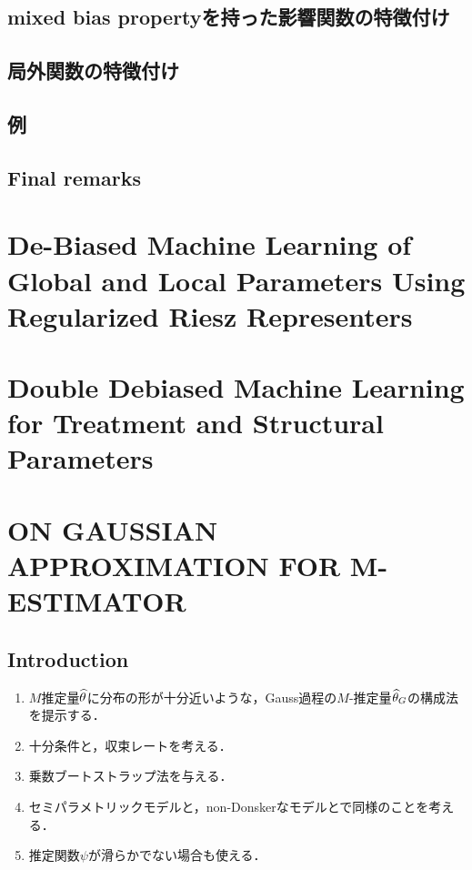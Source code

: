 \documentclass[uplatex,dvipdfmx]{jsreport}
\begin{document}
\subsection{mixed bias propertyを持った影響関数の特徴付け}

\subsection{局外関数の特徴付け}

\subsection{例}

\subsection{Final remarks}

\section{De-Biased Machine Learning of Global and Local Parameters Using Regularized Riesz Representers}

\section{Double Debiased Machine Learning for Treatment and Structural Parameters}

\section{ON GAUSSIAN APPROXIMATION FOR M-ESTIMATOR}

\subsection{Introduction}

\begin{tcolorbox}[colframe=ForestGreen, colback=ForestGreen!10!white,breakable,colbacktitle=ForestGreen!40!white,coltitle=black,fonttitle=\bfseries\sffamily,
title=]
    \begin{enumerate}
        \item $M$推定量$\widehat{\theta}$に分布の形が十分近いような，Gauss過程の$M$-推定量$\widehat{\theta}_G$の構成法を提示する．
        \item 十分条件と，収束レートを考える．
        \item 乗数ブートストラップ法を与える．
        \item セミパラメトリックモデルと，non-Donskerなモデルとで同様のことを考える．
        \item 推定関数$\psi$が滑らかでない場合も使える．
    \end{enumerate}
\end{tcolorbox}
\end{document}
